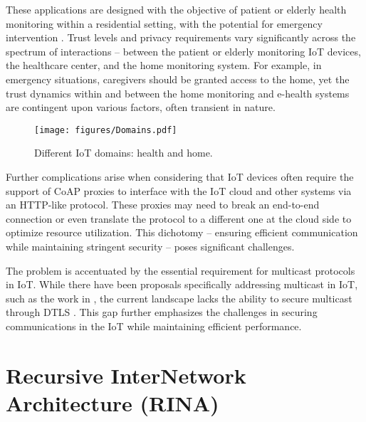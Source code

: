 \documentclass{ieeeaccess}
\begin{document}
These applications are designed with the objective of patient or elderly health monitoring within a residential setting, with the potential for emergency intervention \cite{liu2016smart}. Trust levels and privacy requirements vary significantly across the spectrum of interactions -- between the patient or elderly monitoring IoT devices, the healthcare center, and the home monitoring system. For example, in emergency situations, caregivers should be granted access to the home, yet the trust dynamics within and between the home monitoring and e-health systems are contingent upon various factors, often transient in nature.


\begin{figure}
	\centering
	\texttt{[image: figures/Domains.pdf]}
	\caption{Different IoT domains: health and home.}
	\label{fig:domains}
\end{figure}

Further complications arise when considering that IoT devices often require the support of CoAP proxies to interface with the IoT cloud and other systems via an HTTP-like protocol. These proxies may need to break an end-to-end connection or even translate the protocol to a different one at the cloud side to optimize resource utilization. This dichotomy -- ensuring efficient communication while maintaining stringent security -- poses significant challenges.

The problem is accentuated by the essential requirement for multicast protocols in IoT. While there have been proposals specifically addressing multicast in IoT, such as the work in \cite{huang2016multicast}, the current landscape lacks the ability to secure multicast through DTLS \cite{grammatikis2019securing}. This gap further emphasizes the challenges in securing communications in the IoT while maintaining efficient performance.


\section{Recursive InterNetwork Architecture (RINA)}
\label{sec:rina}
\end{document}
